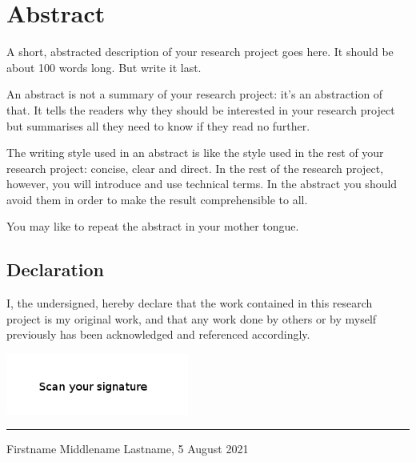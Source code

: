 \chapter*{Abstract} 

A short, abstracted description of your research project goes here. 
It should be about 100 words long. But write it last.

An abstract is not a summary of your research project: it's an abstraction of that. 
It tells the readers why they should be interested in your research project but summarises all
they need to know if they read no further.

The writing style used in an abstract is like the style used in the rest of your research project: concise, clear and direct. 
In the rest of the research project, however, you will introduce and use technical terms. In the abstract you should
avoid them in order to make the result comprehensible to all.

You may like to repeat the abstract in your mother tongue.



\vfill
\section*{Declaration}
I, the undersigned, hereby declare that the work contained in this research project is my original work, and that any work done by others or by myself previously has been acknowledged and referenced accordingly.

\includegraphics[height=2cm]{images/signature.png} \newline \hrule
Firstname Middlename Lastname, 5 August 2021

